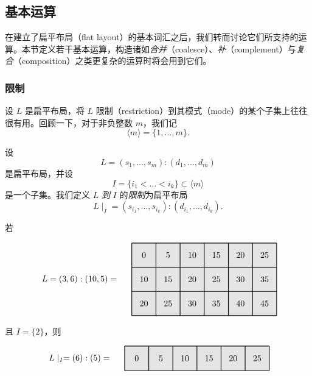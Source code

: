 \subsection{基本运算}

在建立了扁平布局（flat layout）的基本词汇之后，我们转而讨论它们所支持的运算。本节定义若干基本运算，构造诸如{\it 合并}（coalesce）、{\it 补}（complement）与{\it 复合}（composition）之类更复杂的运算时将会用到它们。

\subsubsection{限制}

设 $L$ 是扁平布局，将 $L$ 限制（restriction）到其模式（mode）的某个子集上往往很有用。回顾一下，对于非负整数 $m$，我们记
\[
\langle m \rangle = \{1,\dots,m\}.
\]

\begin{definition}
    设
    \[L = (s_1,\dots,s_m) : (d_1,\dots,d_m)\]
    是扁平布局，并设
    \[
    I = \{i_1<\dots<i_k\} \subset \langle m \rangle
    \]
    是一个子集。我们定义 $L$ {\it 到} $I$ 的{\it 限制}为扁平布局
    \[
    L \mid_I = (s_{i_1},\dots,s_{i_k}):(d_{i_1},\dots,d_{i_k}).
    \]
\end{definition}

\begin{example}
    若

\[
\begin{tikzpicture}[x={(0cm,-1cm)},y={(1cm,0cm)},every node/.style={minimum size=1cm, outer sep=0pt}]

\node[fill=gray!20] at (0,0) {0};
\node[fill=gray!20] at (0,1) {5};
\node[fill=gray!20] at (0,2) {10};
\node[fill=gray!20] at (0,3) {15};
\node[fill=gray!20] at (0,4) {20};
\node[fill=gray!20] at (0,5) {25};
\node[fill=gray!20] at (1,0) {10};
\node[fill=gray!20] at (1,1) {15};
\node[fill=gray!20] at (1,2) {20};
\node[fill=gray!20] at (1,3) {25};
\node[fill=gray!20] at (1,4) {30};
\node[fill=gray!20] at (1,5) {35};
\node[fill=gray!20] at (2,0) {20};
\node[fill=gray!20] at (2,1) {25};
\node[fill=gray!20] at (2,2) {30};
\node[fill=gray!20] at (2,3) {35};
\node[fill=gray!20] at (2,4) {40};
\node[fill=gray!20] at (2,5) {45};
\draw[color=black,thick,shift={(-0.5,-0.5)}] (0,0) grid (3,6);

\node[anchor = east] at (1,-1) {$L = (3,6):(10,5) = $};
\end{tikzpicture}
\]
且 $I = \{2\}$，则

\[
\begin{tikzpicture}[x={(0cm,-1cm)},y={(1cm,0cm)},every node/.style={minimum size=1cm, outer sep=0pt}]
\node[fill=gray!20] at (0,0) {0};
\node[fill=gray!20] at (0,1) {5};
\node[fill=gray!20] at (0,2) {10};
\node[fill=gray!20] at (0,3) {15};
\node[fill=gray!20] at (0,4) {20};
\node[fill=gray!20] at (0,5) {25};
\draw[color=black,thick,shift={(-0.5,-0.5)}] (0,0) grid (1,6);

\node[anchor = east] at (0,-1) {$L\mid_I  = (6):(5) = $};
\end{tikzpicture}
\]

\end{example}

